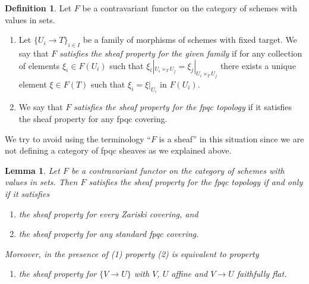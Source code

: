 \documentclass{stacks-project}
\theoremstyle{plain}
\newtheorem{lemma}[subsection]{Lemma}
\theoremstyle{definition}
\newtheorem{definition}[subsection]{Definition}
\theoremstyle{remark}
\numberwithin{equation}{subsection}
\begin{document}
\begin{definition}
\label{definition-sheaf-property-fpqc}
Let $F$ be a contravariant functor on the category
of schemes with values in sets.
\begin{enumerate}
\item Let $\{U_i \to T\}_{i \in I}$ be a family of morphisms
of schemes with fixed target.
We say that $F$ {\it satisfies the sheaf property for the given family}
if for any collection of elements $\xi_i \in F(U_i)$ such that
$\xi_i|_{U_i \times_T U_j} = \xi_j|_{U_i \times_T U_j}$
there exists a unique element
$\xi \in F(T)$ such that $\xi_i = \xi|_{U_i}$ in $F(U_i)$.
\item We say that $F$ {\it satisfies the sheaf property for the
fpqc topology} if it satisfies the sheaf property for any
fpqc covering.
\end{enumerate}
\end{definition}

\noindent
We try to avoid using the terminology ``$F$ is a sheaf'' in this
situation since we are not defining a category of fpqc sheaves
as we explained above.

\begin{lemma}
\label{lemma-sheaf-property-fpqc}
Let $F$ be a contravariant functor on the category
of schemes with values in sets. Then $F$ satisfies
the sheaf property for the fpqc topology if and only
if it satisfies
\begin{enumerate}
\item the sheaf property for every Zariski covering, and
\item the sheaf property for any standard fpqc covering.
\end{enumerate}
Moreover, in the presence of (1) property (2) is equivalent to
property
\begin{enumerate}
\item[(2')] the sheaf property for $\{V \to U\}$
with $V$, $U$ affine and $V \to U$ faithfully flat.
\end{enumerate}
\end{lemma}
\end{document}
